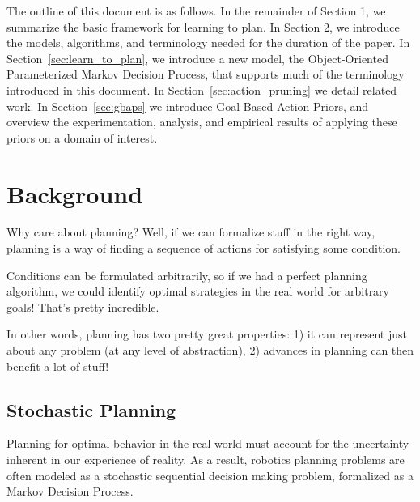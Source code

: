 \documentclass[11pt]{article}
\begin{document}

The outline of this document is as follows. In the remainder of Section 1, we summarize the basic framework for learning to plan. In Section 2, we introduce the models, algorithms, and terminology needed for the duration of the paper. In Section~\ref{sec:learn_to_plan}, we introduce a new model, the Object-Oriented Parameterized Markov Decision Process, that supports much of the terminology introduced in this document. In Section~\ref{sec:action_pruning} we detail related work. In Section~\ref{sec:gbaps} we introduce Goal-Based Action Priors, and overview the experimentation, analysis, and empirical results of applying these priors on a domain of interest.


\section{Background}
\label{sec:background}

Why care about planning? Well, if we can formalize stuff in the right way, planning is a way of finding a sequence of actions for satisfying some condition.

Conditions can be formulated arbitrarily, so if we had a perfect planning algorithm, we could identify optimal strategies in the real world for arbitrary goals! That's pretty incredible.

In other words, planning has two pretty great properties: 1) it can represent just about any problem (at any level of abstraction), 2) advances in planning can then benefit a lot of stuff!



\subsection{Stochastic Planning}

Planning for optimal behavior in the real world must account for the uncertainty inherent in our experience of reality. As a result, robotics planning problems are often modeled as a stochastic sequential decision making problem, formalized as a Markov Decision Process.

\end{document}
